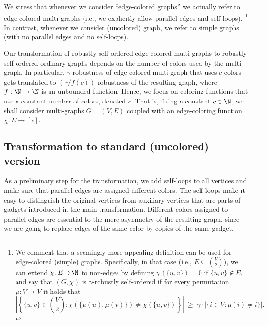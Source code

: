 We stress that whenever we consider ``edge-colored graphs''
we actually refer to edge-colored multi-graphs
(i.e., we explicitly allow parallel edges and self-loops).
\footnote{We comment that a seemingly more appealing definition
can be used for edge-colored (simple) graphs.
Specifically, in that case (i.e., $E\subseteq\binom{V}{2}$),
we can extend $\chi\!:\!E\!\to\!\N$ to non-edges
by defining $\chi(\{u,v\})=0$ if $\{u,v\}\not\in E$,
and say that $(G,\chi)$ is {\sf $\gamma$-robustly self-ordered}
if for every permutation $\mu:V\to{V}$ it holds that\\[-1ex]
$$\left|\left\{\{u,v\}\in \binom{V}{2}:
       \chi(\{\mu(u),\mu(v)\})\!\neq\!\chi(\{u,v\})\right\}\right|
  \;\geq\; \gamma\cdot|\{i\!\in\!V:\mu(i)\neq i\}|.$$}
%
In contrast, whenever we consider (uncolored) graph,
we refer to simple graphs (with no parallel edges and no self-loops).

Our transformation of robustly self-ordered edge-colored multi-graphs
to robustly self-ordered ordinary graphs depends on the number
of colors used by the multi-graph.
In particular, $\gamma$-robustness of edge-colored multi-graph
that uses $c$ colors gets translated to $(\gamma/f(c))$-robustness
of the resulting graph, where $f:\N\to\N$ is an unbounded function.
Hence, we focus on coloring functions that use a constant number of colors,
denoted $c$. That is, fixing a constant $c\in\N$,
we shall consider multi-graphs $G=(V,E)$ coupled with an edge-coloring
function $\chi\!:\!E\!\to\![c]$.
%
%

\subsection{Transformation to standard (uncolored) version}
\label{edge-colored:trans:sec}
As a preliminary step for the transformation,
we add self-loops to all vertices
and make sure that parallel edges are assigned different colors.
The self-loops make it easy to distinguish
the original vertices from auxiliary vertices
that are parts of gadgets introduced in the main transformation.
Different colors assigned to parallel edges are essential
to the mere asymmetry of the resulting graph,
since we are going to replace edges of the same color
by copies of the same gadget.

